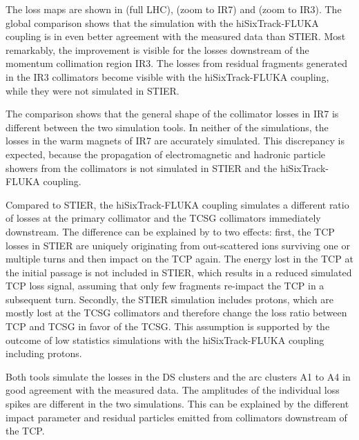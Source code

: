 The loss maps are shown in  (full LHC),  (zoom to IR7) and  (zoom to IR3). The global comparison shows that the simulation with the hiSixTrack-FLUKA coupling is in even better agreement with the measured data than STIER. Most remarkably, the improvement is visible for the losses downstream of the momentum collimation region IR3. The losses from residual fragments generated in the IR3 collimators become visible with the hiSixTrack-FLUKA coupling, while they were not simulated in STIER. 


The comparison shows that the general shape of the collimator losses in IR7 is different between the two simulation tools. In neither of the simulations, the losses in the warm magnets of IR7 are accurately simulated. This discrepancy is expected, because the propagation of electromagnetic and hadronic particle showers from the collimators is not simulated in STIER and the hiSixTrack-FLUKA coupling. 

Compared to STIER, the hiSixTrack-FLUKA coupling simulates a different ratio of losses at the primary collimator and the TCSG collimators immediately downstream. The difference can be explained by to two effects: first, the TCP losses in STIER are uniquely originating from out-scattered \lead ions surviving one or multiple turns and then impact on the TCP again. The energy lost in the TCP at the initial passage is not included in STIER, which results in a reduced simulated TCP loss signal, assuming that only few fragments re-impact the TCP in a subsequent turn. Secondly, the STIER simulation includes protons, which are mostly lost at the TCSG collimators and therefore change the loss ratio between TCP and TCSG in favor of the TCSG. This assumption is supported by the outcome of low statistics simulations with the hiSixTrack-FLUKA coupling including protons. 

Both tools simulate the losses in the DS clusters and the arc clusters A1 to A4 in good agreement with the measured data. The amplitudes of the individual loss spikes are different in the two simulations. This can be explained by the different impact parameter and residual particles emitted from collimators downstream of the TCP. 



